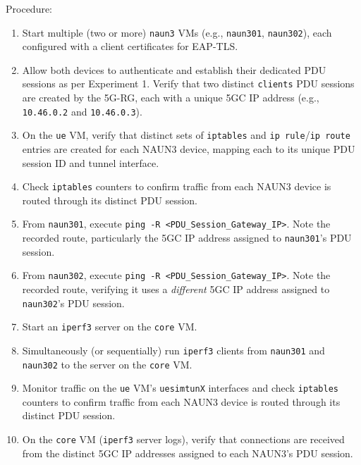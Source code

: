 Procedure:
\begin{enumerate}
    \item Start multiple (two or more) \texttt{naun3} \acp{VM} (e.g., \texttt{naun301}, \texttt{naun302}), each configured with a client certificates for \ac{EAP-TLS}.

    \item Allow both devices to authenticate and establish their dedicated \ac{PDU} sessions as per Experiment 1. Verify that two distinct \texttt{clients} \ac{PDU} sessions are created by the \ac{5G-RG}, each with a unique \ac{5GC} \ac{IP} address (e.g., \texttt{10.46.0.2} and \texttt{10.46.0.3}).
    
    \item On the \texttt{ue} \ac{VM}, verify that distinct sets of \texttt{iptables} and \texttt{ip rule}/\texttt{ip route} entries are created for each \ac{NAUN3} device, mapping each to its unique \ac{PDU} session ID and tunnel interface.

    \item Check \texttt{iptables} counters to confirm traffic from each \ac{NAUN3} device is routed through its distinct \ac{PDU} session.
    
    \item From \texttt{naun301}, execute \texttt{ping -R <PDU\_Session\_Gateway\_IP>}. Note the recorded route, particularly the \ac{5GC} \ac{IP} address assigned to \texttt{naun301}'s \ac{PDU} session.
    
    \item From \texttt{naun302}, execute \texttt{ping -R <PDU\_Session\_Gateway\_IP>}. Note the recorded route, verifying it uses a \textit{different} \ac{5GC} \ac{IP} address assigned to \texttt{naun302}'s \ac{PDU} session.
    
    \item Start an \texttt{iperf3} server on the \texttt{core} \ac{VM}.
    
    \item Simultaneously (or sequentially) run \texttt{iperf3} clients from \texttt{naun301} and \texttt{naun302} to the server on the \texttt{core} \ac{VM}.
    
    \item Monitor traffic on the \texttt{ue} \ac{VM}'s \texttt{uesimtunX} interfaces and check \texttt{iptables} counters to confirm traffic from each \ac{NAUN3} device is routed through its distinct \ac{PDU} session.
    
    \item On the \texttt{core} \ac{VM} (\texttt{iperf3} server logs), verify that connections are received from the distinct \ac{5GC} \ac{IP} addresses assigned to each \ac{NAUN3}'s \ac{PDU} session.
\end{enumerate}

